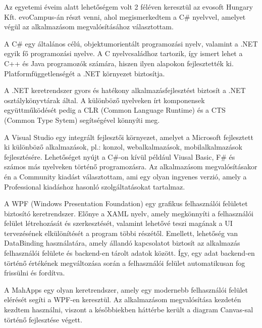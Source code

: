 




Az egyetemi éveim alatt lehetőségem volt 2 féléven keresztül az evosoft Hungary Kft. evoCampus-án részt venni, ahol megismerkedtem a C\# nyelvvel, amelyet végül az alkalmazásom megvalósításához választottam.

A C\# egy általános célú, objektumorientált programozási nyelv, valamint a .NET egyik fő programozási nyelve. A C nyelvcsaládhoz tartozik, így ismert lehet a C++ és Java programozók számára, hiszen ilyen alapokon fejlesztették ki. Platformfüggetlenségét a .NET környezet biztosítja.

A .NET keretrendszer gyors és hatékony alkalmazásfejlesztést biztosít a .NET osztálykönyvtárak által. A különböző nyelveken írt komponensek együttműködését pedig a CLR (Common Language Runtime) és a CTS (Common Type Sytem) segítségével könnyíti meg.\cite{csharp}



A Visual Studio egy integrált fejlesztői környezet, amelyet a Microsoft fejlesztett ki különböző alkalmazások, pl.: konzol, webalkalmazások, mobilalkalmazások fejlesztésére. Lehetőséget nyújt a C\#-on kívül például Viusal Basic, F\# és számos más nyelveken történő programozásra.  Az alkalmazásom megvalósításakor én a Community kiadást választottam, ami egy olyan ingyenes verzió, amely a Professional kiadáshoz hasonló szolgáltatásokat tartalmaz.\cite{vs}




A WPF (Windows Presentation Foundation) egy grafikus felhasználói felületet biztosító keretrendszer. Előnye a XAML nyelv, amely megkönnyíti a felhasználói felület létrehozását és szerkesztését, valamint lehetővé teszi magának a UI tervezésének elkülönítését a program többi részétől. Emellett, lehetőség van DataBinding használatára, amely állandó kapcsolatot biztosít az alkalmazás felhasználói felülete és backend-en tárolt adatok között. Így, egy adat backend-en történő értékének megváltozása során a felhasználói felület automatikusan fog frissülni és fordítva.\cite{wpf}\cite{databinding}

A MahApps egy olyan keretrendszer, amely egy modernebb felhasználói felület elérését segíti a WPF-en keresztül. Az alkalmazásom megvalósítása kezdetén kezdtem használni, viszont a későbbiekben háttérbe került a diagram Canvas-sal történő fejlesztése végett.


